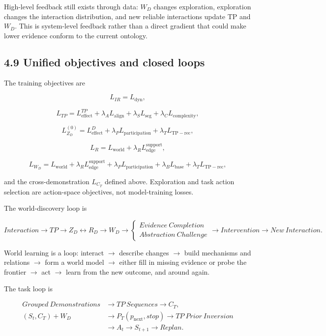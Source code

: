 \documentclass[11pt]{article}
\newenvironment{plainword}{%
  \par\medskip\noindent\begin{minipage}{\textwidth}%
  \color{gray!75!black}\small\itshape
}{%
  \end{minipage}\par\medskip}
\begin{document}
High-level feedback still exists through data: $W_D$ changes exploration, exploration changes the interaction distribution, and new
reliable interactions update TP and $W_D$. This is system-level feedback rather than a direct gradient that could make lower evidence
conform to the current ontology.

\subsection*{4.9 Unified objectives and closed loops}

The training objectives are

\[
\boxed{L_{IR}=L_{\mathrm{dyn}},}
\]

\[
\boxed{L_{TP}=L_{\mathrm{effect}}^{TP}
+\lambda_AL_{\mathrm{align}}
+\lambda_SL_{\mathrm{seg}}
+\lambda_CL_{\mathrm{complexity}},}
\]

\[
\boxed{L_{Z_D}^{(0)}=L_{\mathrm{effect}}^D
+\lambda_PL_{\mathrm{participation}}
+\lambda_TL_{\mathrm{TP-rec}},}
\]

\[
\boxed{L_R=L_{\mathrm{world}}
+\lambda_RL_{\mathrm{edge}}^{\mathrm{support}},}
\]

\[
\boxed{L_{W_D}=L_{\mathrm{world}}
+\lambda_RL_{\mathrm{edge}}^{\mathrm{support}}
+\lambda_PL_{\mathrm{participation}}
+\lambda_BL_{\mathrm{base}}
+\lambda_TL_{\mathrm{TP-rec}},}
\]

and the cross-demonstration $L_{C_T}$ defined above. Exploration and task action selection are action-space objectives, not
model-training losses.

The world-discovery loop is

{\footnotesize
\[
\boxed{
Interaction\rightarrow TP\rightarrow Z_D\leftrightarrow R_D\rightarrow W_D
\rightarrow
\left\{
\begin{array}{c}
Evidence\ Completion\\
Abstraction\ Challenge
\end{array}
\right.
\rightarrow Intervention\rightarrow New\ Interaction.}
\]}

\begin{plainword}
World learning is a loop: interact $\to$ describe changes $\to$ build mechanisms and relations $\to$ form a world model $\to$ either
fill in missing evidence or probe the frontier $\to$ act $\to$ learn from the new outcome, and around again.
\end{plainword}

The task loop is

{\footnotesize
\[
\boxed{
\begin{aligned}
Grouped\ Demonstrations&\rightarrow TP\ Sequences\rightarrow C_T,\\
(S_t,C_T)+W_D&\rightarrow P_T(p_{\mathrm{next}},stop)
\rightarrow TP\ Prior\ Inversion\\
&\rightarrow A_t\rightarrow S_{t+1}\rightarrow Replan.
\end{aligned}}
\]}
\end{document}
